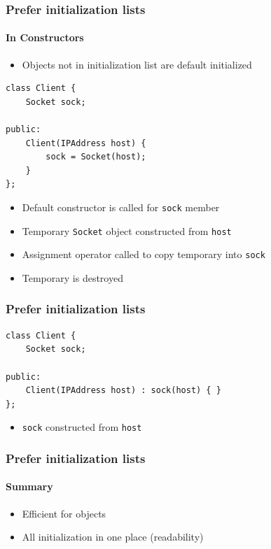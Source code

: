 \documentclass[table]{beamer}
\newcounter{rulecount}
\newcommand{\declarerule}{\textbf{\color{themeblue}{Rule \therulecount:}} }
\begin{document}

\begin{frame}[fragile]
    \frametitle{\declarerule Prefer initialization lists}
    \framesubtitle{In Constructors}
    \begin{itemize}
        \item Objects not in initialization list are default initialized
    \end{itemize}
    \begin{lstlisting}[title=Assignment in constructor]
class Client {
    Socket sock;

public:
    Client(IPAddress host) {
        sock = Socket(host);
    }
};
    \end{lstlisting}
    \begin{itemize}
        \item Default constructor is called for \texttt{sock} member
        \item Temporary \texttt{Socket} object constructed from \texttt{host}
        \item Assignment operator called to copy temporary into \texttt{sock}
        \item Temporary is destroyed
    \end{itemize}
\end{frame}

\begin{frame}[fragile]
    \frametitle{\declarerule Prefer initialization lists}
    \begin{lstlisting}[title=Initialization list]
class Client {
    Socket sock;

public:
    Client(IPAddress host) : sock(host) { }
};
    \end{lstlisting}
    \begin{itemize}
        \item \texttt{sock} constructed from \texttt{host}
    \end{itemize}
\end{frame}

\begin{frame}
    \frametitle{\declarerule Prefer initialization lists}
    \framesubtitle{Summary}
    \begin{itemize}
        \item Efficient for objects
        \item All initialization in one place (readability)
    \end{itemize}
\end{frame}
\end{document}
